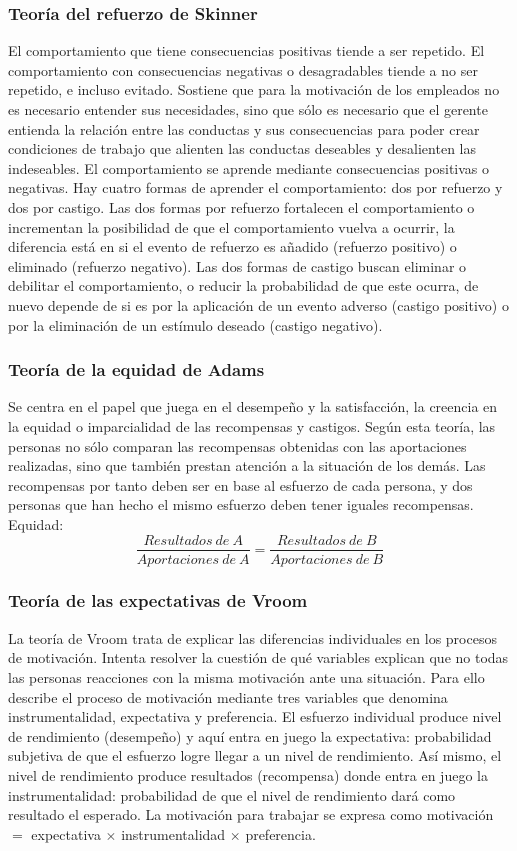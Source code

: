 \documentclass[12pt]{article}
\theoremstyle{definition_wo_parentheses}
\begin{document}
\subsubsection{Teoría del refuerzo de Skinner}
El comportamiento que tiene consecuencias positivas tiende a ser repetido. El comportamiento con consecuencias negativas o desagradables tiende a no ser repetido, e incluso evitado. Sostiene que para la motivación de los empleados no es necesario entender sus necesidades, sino que sólo es necesario que el gerente entienda la relación entre las conductas y sus consecuencias para poder crear condiciones de trabajo que alienten las conductas deseables y desalienten las indeseables. El comportamiento se aprende mediante consecuencias positivas o negativas. Hay cuatro formas de aprender el comportamiento: dos por refuerzo y dos por castigo. Las dos formas por refuerzo fortalecen el comportamiento o incrementan la posibilidad de que el comportamiento vuelva a ocurrir, la diferencia está en si el evento de refuerzo es añadido (refuerzo positivo) o eliminado (refuerzo negativo). Las dos formas de castigo buscan eliminar o debilitar el comportamiento, o reducir la probabilidad de que este ocurra, de nuevo depende de si es por la aplicación de un evento adverso (castigo positivo) o por la eliminación de un estímulo deseado (castigo negativo).

\subsubsection{Teoría de la equidad de Adams}
Se centra en el papel que juega en el desempeño y la satisfacción, la creencia en la equidad o imparcialidad de las recompensas y castigos. Según esta teoría, las personas no sólo comparan las recompensas obtenidas con las aportaciones realizadas, sino que también prestan atención a la situación de los demás. Las recompensas por tanto deben ser en base al esfuerzo de cada persona, y dos personas que han hecho el mismo esfuerzo deben tener iguales recompensas. Equidad:
\[ \frac{Resultados\ de\ A}{Aportaciones\ de\ A} = \frac{Resultados\ de\ B}{Aportaciones\ de\ B}	\]

\subsubsection{Teoría de las expectativas de Vroom}
La teoría de Vroom trata de explicar las diferencias individuales en los procesos de motivación. Intenta resolver la cuestión de qué variables explican que no todas las personas reacciones con la misma motivación ante una situación. Para ello describe el proceso de motivación mediante tres variables que denomina instrumentalidad, expectativa y preferencia. El esfuerzo individual produce nivel de rendimiento (desempeño) y aquí entra en juego la expectativa: probabilidad subjetiva de que el esfuerzo logre llegar a un nivel de rendimiento. Así mismo, el nivel de rendimiento produce resultados (recompensa) donde entra en juego la instrumentalidad: probabilidad de que el nivel de rendimiento dará como resultado el esperado. La motivación para trabajar se expresa como motivación $=$ expectativa $\times$ instrumentalidad $\times$ preferencia.\\
\end{document}
